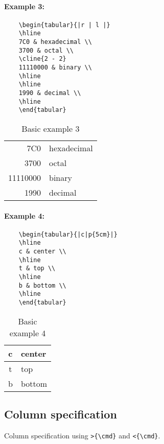 \paragraph{Example 3:}

\begin{verbatim}
	\begin{tabular}{|r | l |}
	\hline
	7C0 & hexadecimal \\
	3700 & octal \\
	\cline{2 - 2}
	11110000 & binary \\
	\hline
	\hline
	1990 & decimal \\
	\hline
	\end{tabular}
\end{verbatim}
\begin{table}[htbp]
	\centering
	\begin{tabular}{|r | l |}
	\hline
	7C0 & hexadecimal \\
	3700 & octal \\
	\cline{2 - 2}
	11110000 & binary \\
	\hline
	\hline
	1990 & decimal \\
	\hline
	\end{tabular}
	\caption{Basic example 3}
	\label{tablebasic3}
\end{table}


\paragraph{Example 4:}
\begin{verbatim}
	\begin{tabular}{|c|p{5cm}|}
	\hline
	c & center \\
	\hline
	t & top \\
	\hline
	b & bottom \\
	\hline
	\end{tabular}
\end{verbatim}

\begin{table}[htbp]
	\centering
	\begin{tabular}{|c|p{5cm}|}
	\hline
	c & center \\
	\hline
	t & top \\
	\hline
	b & bottom \\
	\hline
	\end{tabular}
	\caption{Basic example 4}
	\label{tablebasic4}
\end{table}
\subsection{Column specification}
Column specification using \verb|>{\cmd}| and \verb|<{\cmd}|.

